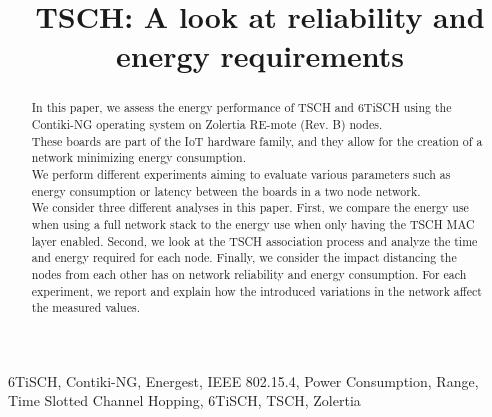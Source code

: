 \documentclass[conference]{IEEEtran}
\renewcommand\_{\textunderscore\allowbreak}
\begin{document}
\title{TSCH: A look at reliability and energy requirements}

\author{
\and
{}
}

\maketitle

\begin{abstract}
In this paper, we assess the energy performance of TSCH and 6TiSCH using the Contiki-NG operating system on Zolertia RE-mote (Rev. B) nodes.\\
These boards are part of the IoT hardware family, and they allow for the creation of a network minimizing energy consumption.\\
We perform different experiments aiming to evaluate various parameters such as energy consumption or latency between the boards in a two node network.\\
We consider three different analyses in this paper. First, we compare the energy use when using a full network stack to the energy use when only having the TSCH MAC layer enabled. Second, we look at the TSCH association process and analyze the time and energy required for each node. Finally, we consider the impact distancing the nodes from each other has on network reliability and energy consumption. 
\cite{TODO: FIX ABSTRACT}
For each experiment, we report and explain how the introduced variations in the network affect the measured values.
\end{abstract}

\begin{IEEEkeywords}
6TiSCH, Contiki-NG, Energest, IEEE 802.15.4, Power Consumption, Range, Time Slotted Channel Hopping, 6TiSCH, TSCH, Zolertia
\end{IEEEkeywords}
\end{document}
